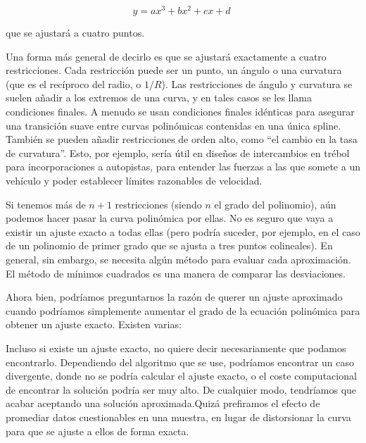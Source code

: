 \documentclass{article}
\begin{document}
\[
y = ax^3 + bx^2 + cx + d\;
\]

que se ajustará a cuatro puntos.

Una forma más general de decirlo es que se ajustará exactamente a cuatro
restricciones. Cada restricción puede ser un punto, un ángulo o una
curvatura (que es el recíproco del radio, o $1/R$). Las restricciones de
ángulo y curvatura se suelen añadir a los extremos de una curva, y en
tales casos se les llama condiciones finales. A menudo se usan
condiciones finales idénticas para asegurar una transición suave entre
curvas polinómicas contenidas en una única spline. También se pueden
añadir restricciones de orden alto, como ``el cambio en la tasa de
curvatura''. Esto, por ejemplo, sería útil en diseños de intercambios en
trébol para incorporaciones a autopistas, para entender las fuerzas a
las que somete a un vehículo y poder establecer límites razonables de
velocidad.

Si tenemos más de $n + 1$ restricciones (siendo $n$ el grado del
polinomio), aún podemos hacer pasar la curva polinómica por ellas. No es
seguro que vaya a existir un ajuste exacto a todas ellas (pero podría
suceder, por ejemplo, en el caso de un polinomio de primer grado que se
ajusta a tres puntos colineales). En general, sin embargo, se necesita
algún método para evaluar cada aproximación. El método de mínimos
cuadrados es una manera de comparar las desviaciones.

Ahora bien, podríamos preguntarnos la razón de querer un ajuste
aproximado cuando podríamos simplemente aumentar el grado de la ecuación
polinómica para obtener un ajuste exacto. Existen varias:

Incluso si existe un ajuste exacto, no quiere decir necesariamente que
podamos encontrarlo. Dependiendo del algoritmo que se use, podríamos
encontrar un caso divergente, donde no se podría calcular el ajuste
exacto, o el coste computacional de encontrar la solución podría ser muy
alto. De cualquier modo, tendríamos que acabar aceptando una solución
aproximada.Quizá prefiramos el efecto de promediar datos cuestionables
en una muestra, en lugar de distorsionar la curva para que se ajuste a
ellos de forma exacta.
\end{document}
